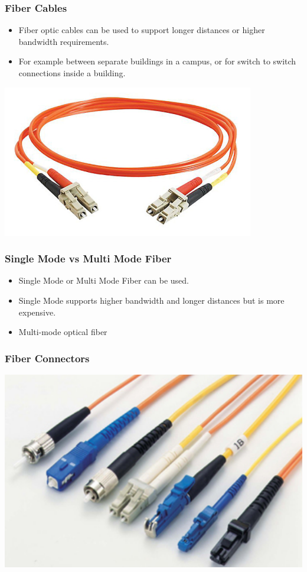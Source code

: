 \documentclass[pdflatex,compress,mathserif]{beamer}
\begin{document}
\begin{frame}
	\frametitle{Fiber Cables}
	\begin{itemize}
		\item Fiber optic cables can be used to support longer distances or higher bandwidth requirements.
		\item For example between separate buildings in a campus, or for switch to switch connections inside a building.
	\end{itemize}
	\begin{center}
		\includegraphics[width=0.6\linewidth]{img/img01}
	\end{center}
\end{frame}

\begin{frame}
	\frametitle{Single Mode vs Multi Mode Fiber}
	\begin{itemize}
		\item Single Mode or Multi Mode Fiber can be used.
		\item Single Mode supports higher bandwidth and longer distances but is more expensive.
		\item Multi-mode optical fiber \href{https://en.wikipedia.org/wiki/Multi-mode_optical_fiber}{} 
	\end{itemize}
\end{frame}

\begin{frame}
	\frametitle{Fiber Connectors}
	\begin{center}
		\includegraphics[width=0.6\linewidth]{img/img02}
	\end{center}
\end{frame}
\end{document}
